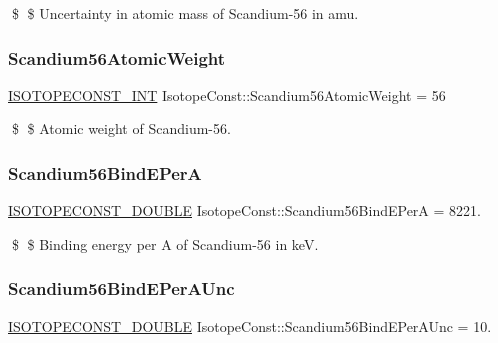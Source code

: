 \$ \$ Uncertainty in atomic mass of Scandium-\/56 in amu. \mbox{\label{group___isotope_const-_scandium-_sc56_ga3301cec46972145d1a5efd2e6542e146}} 
\subsubsection{\texorpdfstring{Scandium56\+Atomic\+Weight}{Scandium56AtomicWeight}}
{\footnotesize\ttfamily \mbox{\hyperlink{group___isotope_const-_macros_ga5f18360b3e99483a35c32d789e62621c}{I\+S\+O\+T\+O\+P\+E\+C\+O\+N\+S\+T\+\_\+\+I\+NT}} Isotope\+Const\+::\+Scandium56\+Atomic\+Weight = 56}

\$ \$ Atomic weight of Scandium-\/56. \mbox{\label{group___isotope_const-_scandium-_sc56_ga3a41e9a8858f3a47333b262d5a8dbe37}} 
\subsubsection{\texorpdfstring{Scandium56\+Bind\+E\+PerA}{Scandium56BindEPerA}}
{\footnotesize\ttfamily \mbox{\hyperlink{group___isotope_const-_macros_ga8f45a7272ce02c0b4c65c44636ed719a}{I\+S\+O\+T\+O\+P\+E\+C\+O\+N\+S\+T\+\_\+\+D\+O\+U\+B\+LE}} Isotope\+Const\+::\+Scandium56\+Bind\+E\+PerA = 8221.}

\$ \$ Binding energy per A of Scandium-\/56 in keV. \mbox{\label{group___isotope_const-_scandium-_sc56_ga42cbc0bcce1ab951dc763fc472fbfc20}} 
\subsubsection{\texorpdfstring{Scandium56\+Bind\+E\+Per\+A\+Unc}{Scandium56BindEPerAUnc}}
{\footnotesize\ttfamily \mbox{\hyperlink{group___isotope_const-_macros_ga8f45a7272ce02c0b4c65c44636ed719a}{I\+S\+O\+T\+O\+P\+E\+C\+O\+N\+S\+T\+\_\+\+D\+O\+U\+B\+LE}} Isotope\+Const\+::\+Scandium56\+Bind\+E\+Per\+A\+Unc = 10.}

